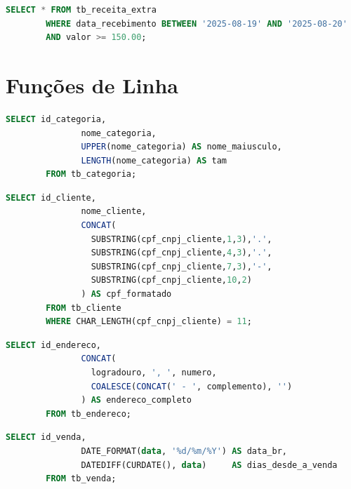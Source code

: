 \documentclass[
12pt,
a4paper,
semrecuonosumario,
sumario = abnt-6027-2012]{report}
\begin{document}
    \begin{lstlisting}[language=SQL,caption={SELECT -- Tabela \texttt{tb\_receita\_extra}}]
        SELECT * FROM tb_receita_extra
        WHERE data_recebimento BETWEEN '2025-08-19' AND '2025-08-20'
        AND valor >= 150.00;
    \end{lstlisting}

    \section{Funções de Linha}


    \begin{lstlisting}[language=SQL,caption={SELECT -- String: maiusculização e tamanho do texto}]
        SELECT id_categoria,
               nome_categoria,
               UPPER(nome_categoria) AS nome_maiusculo,
               LENGTH(nome_categoria) AS tam
        FROM tb_categoria;
    \end{lstlisting}

    \begin{lstlisting}[language=SQL,caption={SELECT -- String: máscara simples de CPF (11 dígitos)}]
        SELECT id_cliente,
               nome_cliente,
               CONCAT(
                 SUBSTRING(cpf_cnpj_cliente,1,3),'.',
                 SUBSTRING(cpf_cnpj_cliente,4,3),'.',
                 SUBSTRING(cpf_cnpj_cliente,7,3),'-',
                 SUBSTRING(cpf_cnpj_cliente,10,2)
               ) AS cpf_formatado
        FROM tb_cliente
        WHERE CHAR_LENGTH(cpf_cnpj_cliente) = 11;
    \end{lstlisting}

    \begin{lstlisting}[language=SQL,caption={SELECT -- String + NULL-safe: endereço completo (COALESCE)}]
        SELECT id_endereco,
               CONCAT(
                 logradouro, ', ', numero,
                 COALESCE(CONCAT(' - ', complemento), '')
               ) AS endereco_completo
        FROM tb_endereco;
    \end{lstlisting}

    \begin{lstlisting}[language=SQL,caption={SELECT -- Data: formatação BR e diferença de dias}]
        SELECT id_venda,
               DATE_FORMAT(data, '%d/%m/%Y') AS data_br,
               DATEDIFF(CURDATE(), data)     AS dias_desde_a_venda
        FROM tb_venda;
    \end{lstlisting}
\end{document}
